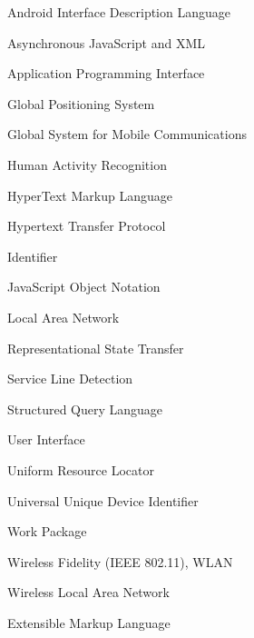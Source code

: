 \documentclass[external]{20120615_deliverable_template_ukob}
\theoremstyle{definition}
\begin{document}
\begin{LGAbbreviations}


{Android Interface Description Language}

{Asynchronous JavaScript and XML}

{Application Programming Interface}

{Global Positioning System}

{Global System for Mobile Communications}

{Human Activity Recognition}

{HyperText Markup Language}

{Hypertext Transfer Protocol}

{Identifier}

{JavaScript Object Notation}

{Local Area Network}

{Representational State Transfer}

{Service Line Detection}

{Structured Query Language}

{User Interface}

{Uniform Resource Locator}

{Universal Unique Device Identifier}

{Work Package}

{Wireless Fidelity (IEEE 802.11), WLAN}

{Wireless Local Area Network}

{Extensible Markup Language}

\LGaddabbreviation{~\\}
{~~~}

\end{LGAbbreviations}

\end{document}
